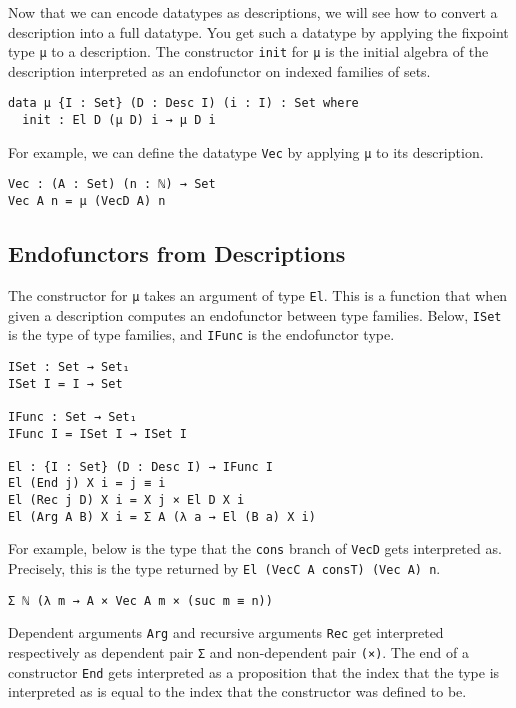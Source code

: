 \documentclass[preprint,nonatbib]{sigplanconf}
\begin{document}
Now that we can encode datatypes as descriptions, we will see how to
convert a description into a full datatype. You get such a datatype by
applying the fixpoint type {\tt μ} to a description.
The constructor {\tt init}
for {\tt μ} is the initial algebra of the description interpreted as
an endofunctor on indexed families of sets.

\begin{verbatim}
data μ {I : Set} (D : Desc I) (i : I) : Set where
  init : El D (μ D) i → μ D i
\end{verbatim}

For example, we can define the datatype {\tt Vec} by applying
{\tt μ} to its description.

\begin{verbatim}
Vec : (A : Set) (n : ℕ) → Set
Vec A n = μ (VecD A) n
\end{verbatim}

\subsection{Endofunctors from Descriptions}

The constructor for {\tt μ} takes an argument of type {\tt El}.
This is a function that when given a description computes an
endofunctor between type families. Below, {\tt ISet} is the type of
type families, and {\tt IFunc} is the endofunctor type.

\begin{verbatim}
ISet : Set → Set₁
ISet I = I → Set

IFunc : Set → Set₁
IFunc I = ISet I → ISet I

El : {I : Set} (D : Desc I) → IFunc I
El (End j) X i = j ≡ i
El (Rec j D) X i = X j × El D X i
El (Arg A B) X i = Σ A (λ a → El (B a) X i)
\end{verbatim}

For example, below is the type that the {\tt cons} branch of
{\tt VecD} gets interpreted as. Precisely, this is the type returned
by {\tt El (VecC A consT) (Vec A) n}.

\begin{verbatim}
Σ ℕ (λ m → A × Vec A m × (suc m ≡ n))
\end{verbatim}

Dependent arguments {\tt Arg} and recursive arguments
{\tt Rec} get interpreted respectively as dependent pair
{\tt Σ} and non-dependent pair {\tt (×)}. The end of a constructor
{\tt End} gets interpreted as a proposition that the index that the
type is interpreted as is equal to the index that the constructor was
defined to be.
\end{document}
